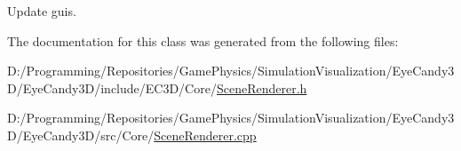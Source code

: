 Update guis. 



The documentation for this class was generated from the following files\+:\begin{DoxyCompactItemize}
\item 
D\+:/\+Programming/\+Repositories/\+Game\+Physics/\+Simulation\+Visualization/\+Eye\+Candy3\+D/\+Eye\+Candy3\+D/include/\+E\+C3\+D/\+Core/\mbox{\hyperlink{_scene_renderer_8h}{Scene\+Renderer.\+h}}\item 
D\+:/\+Programming/\+Repositories/\+Game\+Physics/\+Simulation\+Visualization/\+Eye\+Candy3\+D/\+Eye\+Candy3\+D/src/\+Core/\mbox{\hyperlink{_scene_renderer_8cpp}{Scene\+Renderer.\+cpp}}\end{DoxyCompactItemize}

